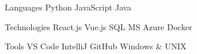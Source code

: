 

\begin{cvskills}

  \cvskill
  {Languages} %
  {
    Python
      {\enskip\cdotp\enskip} JavaScript
      {\enskip\cdotp\enskip} Java
  } %

  \cvskill
  {Technologies} %
  {
    React.js
      {\enskip\cdotp\enskip} Vue.js
      {\enskip\cdotp\enskip} SQL
      {\enskip\cdotp\enskip} MS Azure
      {\enskip\cdotp\enskip} Docker
  } %

  \cvskill
  {Tools} %
  {
    VS Code
      {\enskip\cdotp\enskip} IntelliJ
      {\enskip\cdotp\enskip} GitHub
      {\enskip\cdotp\enskip} Windows \& UNIX
  } %


\end{cvskills}
